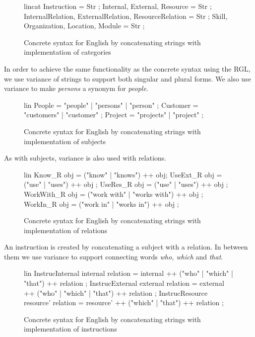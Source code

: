 \begin{figure}[H]
\begin{code}
lincat
 Instruction = Str ;
 Internal, External, Resource = Str ;
 InternalRelation, ExternalRelation, ResourceRelation = Str ;
 Skill, Organization, Location, Module = Str ;
\end{code}
\caption{Concrete syntax for English by concatenating strings with implementation of categories\label{fig:concat-english-cat}}
\end{figure}

In order to achieve the same functionality as the concrete syntax using the RGL, we use variance of strings to support both singular and plural forms. We also use variance to make \emph{persons} a synonym for \emph{people}.

\begin{figure}[H]
\begin{code}
lin
 People = "people" | "persons" | "person" ;
 Customer = "customers" | "customer" ;
 Project = "projects" | "project" ;
\end{code}
\caption{Concrete syntax for English by concatenating strings with implementation of subjects\label{fig:concat-english-subjects}}
\end{figure}

As with subjects, variance is also used with relations.

\begin{figure}[H]
\begin{code}
lin
 Know_R obj = ("know" | "knows") ++ obj;
 UseExt_R obj = ("use" | "uses") ++ obj ;
 UseRes_R obj = ("use" | "uses") ++ obj ;
 WorkWith_R obj = ("work with" | "works with") ++ obj ;
 WorkIn_R obj = ("work in" | "works in") ++ obj ;
\end{code}
\caption{Concrete syntax for English by concatenating strings with implementation of relations\label{fig:concat-english-relations}}
\end{figure}

An instruction is created by concatenating a subject with a relation. In between them we use variance to support connecting words \emph{who, which} and \emph{that}.

\begin{figure}[H]
\begin{code}
lin
 InstrucInternal internal relation = internal ++ 
                                  ("who" | "which" | "that") ++ relation ;
 InstrucExternal external relation = external ++ 
                                  ("who" | "which" | "that") ++ relation ;
 InstrucResource resource' relation = resource' ++ 
                                  ("which" | "that") ++ relation ;
\end{code}
\caption{Concrete syntax for English by concatenating strings with implementation of instructions\label{fig:concat-english-instrucs}}
\end{figure}


